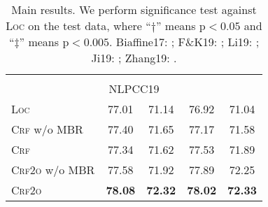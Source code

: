 \begin{table}[tb]
\begin{tabular}{lcccc}
\hline
\\[-8pt]
\multicolumn{5}{c}{NLPCC19} \\
\textsc{Loc}           &         77.01  &         71.14  &         76.92                    &         71.04 \\
\textsc{Crf} w/o MBR   &         77.40  &         71.65  &         77.17                    &         71.58 \\
\textsc{Crf}           &         77.34  &         71.62  &         77.53\rlap{$^\ddagger$}  &         71.89\rlap{$^\ddagger$} \\
\textsc{Crf2o} w/o MBR &         77.58  &         71.92  &         77.89                    &         72.25 \\
\textsc{Crf2o}         & \textbf{78.08} & \textbf{72.32} & \textbf{78.02}\rlap{$^\ddagger$} & \textbf{72.33}\rlap{$^\ddagger$} \\
\bottomrule
\end{tabular}
\caption{Main results. We perform significance test against \textsc{Loc} on the test data, where ``$\dagger$'' means $\mathrm{p} < 0.05$ and ``$\ddagger$'' means $\mathrm{p} < 0.005$.
Biaffine17: \citet{Timothy-d17-biaffine}; F\&K19: \citet{falenska-kuhn-2019-non};
Li19: \citet{li-etal-2019-attentive}; Ji19: \citet{ji-etal-2019-graph};
Zhang19: \citet{zhang-etal-2019-empirical}.
}
\label{table:dev-test}
\end{table}


